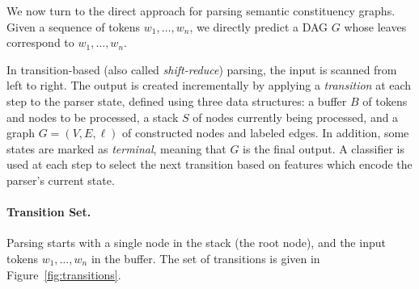 \documentclass[11pt]{article}
\newcommand{\figref}[1]{Figure~\ref{#1}}
\begin{document}
We now turn to the direct approach for parsing semantic constituency graphs. Given a sequence
of tokens $w_1, \ldots, w_n$, we directly predict a DAG $G$ whose leaves
correspond to  $w_1, \ldots, w_n$.


In transition-based (also called \textit{shift-reduce}) parsing, the input is scanned from left to right.
The output is created incrementally by applying a \textit{transition} at each step to the parser state,
defined using three data structures: a buffer $B$ of tokens and nodes to be processed,
a stack $S$ of nodes currently being processed,
and a graph $G=(V,E,\ell)$ of constructed nodes and labeled edges.
In addition, some states are marked as \textit{terminal}, meaning that $G$ is the final output.
A classifier is used at each step to select the next transition based on features
which encode the parser's current state.

\paragraph{Transition Set.}
Parsing starts with a single node in the stack (the root node), and the input tokens
$w_1, \ldots, w_n$ in the buffer. The set of transitions is given in \figref{fig:transitions}.
\end{document}
